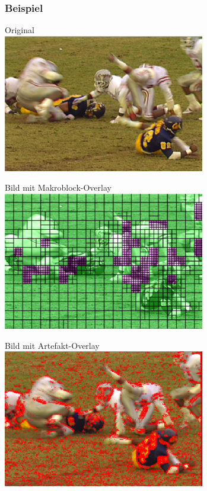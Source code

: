 \documentclass[t]{beamer}
\begin{document}
\begin{frame}
	\frametitle{Beispiel}

	\begin{center}
		Original ~\\
		\includegraphics[scale=.2]{football-original.png}	
	\end{center}
	\begin{minipage}{5cm}
		\begin{center}
			Bild mit Makroblock-Overlay ~\\
			\includegraphics[scale=.2]{football-macroblock.png}		
		\end{center}	
	\end{minipage}
	\hfill
	\begin{minipage}{5cm}
		\begin{center}
			Bild mit Artefakt-Overlay ~\\
			\includegraphics[scale=.455]{football-artifact.png}
		\end{center}	
	\end{minipage}
	\hfill
\end{frame}
\end{document}
